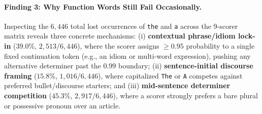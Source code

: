 \documentclass[11pt]{article}
\begin{document}
\paragraph{Finding 3: Why Function Words Still Fail Occasionally.}
Inspecting the $6{,}446$ total lost occurrences of \texttt{the} and \texttt{a} across the 9-scorer matrix reveals three concrete mechanisms: (i) \textbf{contextual phrase/idiom lock-in} ($39.0\%$, $2{,}513/6{,}446$), where the scorer assigns $\ge 0.95$ probability to a single fixed continuation token (e.g., an idiom or multi-word expression), pushing any alternative determiner past the $0.99$ boundary; (ii) \textbf{sentence-initial discourse framing} ($15.8\%$, $1{,}016/6{,}446$), where capitalized \texttt{The} or \texttt{A} competes against preferred bullet/discourse starters; and (iii) \textbf{mid-sentence determiner competition} ($45.3\%$, $2{,}917/6{,}446$), where a scorer strongly prefers a bare plural or possessive pronoun over an article.
\end{document}
